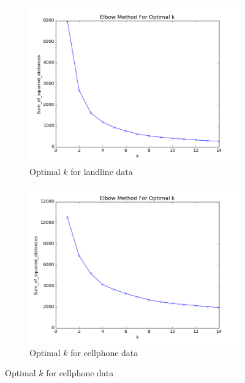 \documentclass[20pt]{article} %
\begin{document}
\begin{figure}[!htbp]
  	\centering
   	\begin{subfigure}[p]{0.4\linewidth}
    	\includegraphics[width=\linewidth]{../figures/landline/optimal_kmeans.png}
	\caption{Optimal $k$ for landline data}
   	\end{subfigure}
   	\begin{subfigure}[p]{0.4\linewidth}
    	\includegraphics[width=\linewidth]{../figures/cellphone_cluster/kmeans.png}
	\caption{Optimal $k$ for cellphone data}
   	\end{subfigure}
\end{figure} 
\end{document}
